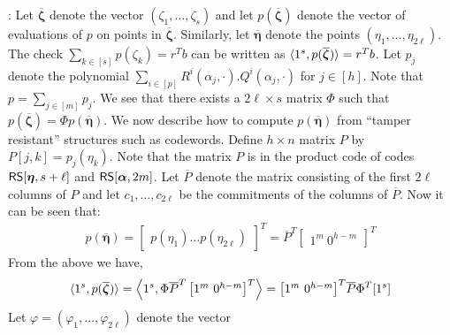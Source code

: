 : Let $\overline{\bm{\zeta}}$ denote the vector $(\zeta_1,\ldots,\zeta_s)$ and let $p(\overline{\bm{\zeta}})$ denote the vector of
evaluations of $p$ on points in $\overline{\bm{\zeta}}$. Similarly, let $\overline{\bm{\eta}}$ denote
the points $(\eta_1,\ldots,\eta_{2\ell})$. The check $\sum_{k\in
[s]}p(\zeta_k)=r^Tb$ can be written as $\langle 1^s,p(\overline{\bm{\zeta}})\rangle=r^Tb$. 
Let $p_j$ denote the polynomial $\sum_{i\in
[p]}R^i(\alpha_j,\cdot).Q^i(\alpha_j,\cdot)$ for $j\in [h]$. Note that
$p=\sum_{j\in [m]}p_j$. We see that there exists a $2\ell\times s$ matrix
$\Phi$ such that $p(\overline{\bm{\zeta}})=\Phi p(\overline{\bm{\eta}})$. 
We now describe
how to compute $p(\overline{\bm{\eta}})$ from ``tamper resistant'' structures
such as codewords. Define $h\times n$ matrix $P$ by $P[j,k]=p_j(\eta_k)$. Note
that the matrix $P$ is in the product code of codes $\mathsf{RS}[\bm{\eta},s+\ell]$ and
$\mathsf{RS}[\bm{\alpha},2m]$. Let $\overline{P}$ denote the matrix consisting of the first
$2\ell$ columns of $P$ and let $c_1,\ldots,c_{2\ell}$ be the commitments of the
columns of $\overline{P}$. Now it can be seen that:
\begin{align}
p(\overline{\bm{\eta}}) = 
\begin{bmatrix} p(\eta_1) \hdots p(\eta_{2\ell}) \end{bmatrix}^T = 
	\overline{P}^T\begin{bmatrix}
	1^m\ 0^{h-m}
	\end{bmatrix}^T
\end{align}
From the above we have, 
\begin{align}\label{eq:necessarycondlin}
\innp{1^s}{p(\overline{\bm{\zeta}})} = \left\langle 1^s, \Phi\overline{P}^T\begin{bmatrix}
1^m \  0^{h-m} \end{bmatrix}^T\right\rangle = {\begin{bmatrix} 1^m \ 0^{h-m}
\end{bmatrix}}^T\overline{P}\Phi^T[1^s]
\end{align}
Let $\varphi=(\varphi_1,\ldots,\varphi_{2\ell})$ denote the vector
